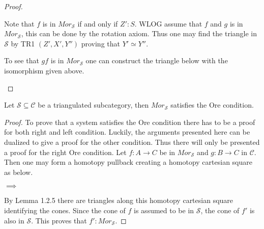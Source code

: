 \begin{proof}
\begin{center}
        \end{center}
        Note that $f$ is in $Mor_\mathcal{S}$ if and only if $Z' : S$. WLOG assume that $f$ and $g$ is in $Mor_\mathcal{S}$, this can be done by the rotation axiom. Thus one may find the triangle in $\mathcal{S}$ by TR1 $(Z',X',Y'')$ proving that $Y'\simeq Y''$.
        \begin{center}
        \end{center}
        To see that $gf$ is in $Mor_\mathcal{S}$ one can construct the triangle below with the isomorphism given above.
        \begin{center}
        \end{center}
    \end{proof}

    \begin{prop}
        Let $\mathcal{S}\subseteq\mathcal{C}$ be a triangulated subcategory, then $Mor_\mathcal{S}$ satisfies the Ore condition.
    \end{prop}

    \begin{proof}
        To prove that a system satisfies the Ore condition there has to be a proof for both right and left condition. Luckily, the arguments presented here can be dualized to give a proof for the other condition. Thus there will only be presented a proof for the right Ore condition.
        Let $f:A\rightarrow C$ be in $Mor_\mathcal{S}$ and $g:B\rightarrow C$ in $\mathcal{C}$. Then one may form a homotopy pullback creating a homotopy cartesian square as below.
        \begin{center}
            $\implies$
        \end{center}
        By Lemma 1.2.5 there are triangles along this homotopy cartesian square identifying the cones. Since the cone of $f$ is assumed to be in $\mathcal{S}$, the cone of $f'$ is also in $\mathcal{S}$. This proves that $f':Mor_\mathcal{S}$.
    \end{proof}

